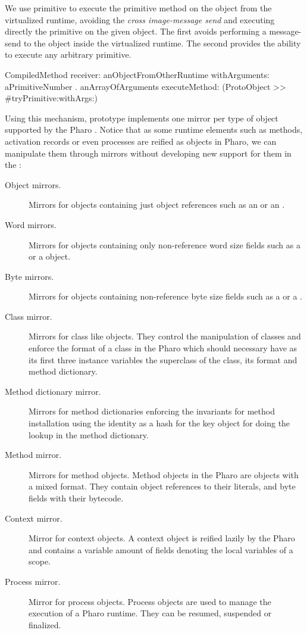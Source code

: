 We use primitive  to execute the primitive method  on the object from the virtualized runtime, avoiding the \emph{cross image-message send} and executing directly the primitive on the given object. The first avoids performing a message-send to the object inside the virtualized runtime. The second provides the ability to execute any arbitrary primitive.

\begin{code}
CompiledMethod
       receiver: anObjectFromOtherRuntime
       withArguments: { aPrimitiveNumber . anArrayOfArguments }
       executeMethod: (ProtoObject >> #tryPrimitive:withArgs:)
\end{code}

Using this mechanism, \Vtt prototype implements one mirror per type of object supported by the Pharo \VM. Notice that as some runtime elements such as methods, activation records or even processes are reified as objects in Pharo, we can manipulate them through mirrors without developing new support for them in the \VM:

\begin{description}
\item[Object mirrors.] Mirrors for objects containing just object references such as an  or an .
\item[Word mirrors.] Mirrors for objects containing only non-reference word size fields such as a  or a  object.
\item[Byte mirrors.] Mirrors for objects containing non-reference byte size fields such as a  or a . 
\item[Class mirror.] Mirrors for class like objects. They control the manipulation of classes and enforce the format of a class in the Pharo \VM which should necessary have as its first three instance variables the superclass of the class, its format and method dictionary.
\item[Method dictionary mirror.] Mirrors for method dictionaries enforcing the \VM invariants for method installation \ie using the identity as a hash for the key object for doing the lookup in the method dictionary.
\item[Method mirror.] Mirrors for method objects. Method objects in the Pharo \VM are objects with a mixed format. They contain object references to their literals, and byte fields with their bytecode.
\item[Context mirror.] Mirror for context objects. A context object is reified lazily by the Pharo \VM and contains a variable amount of fields denoting the local variables of a scope.
\item[Process mirror.] Mirror for process objects. Process objects are used to manage the execution of a Pharo runtime. They can be resumed, suspended or finalized.
\end{description}


